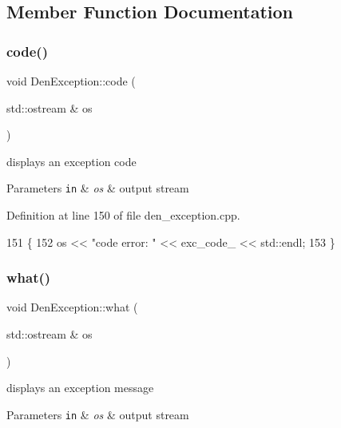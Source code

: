 \subsection{Member Function Documentation}
\mbox{\label{classDenException_a81eaeb9c2f6845516f25ead861040a93}} 
\subsubsection{\texorpdfstring{code()}{code()}}
{\footnotesize\ttfamily void Den\+Exception\+::code (\begin{DoxyParamCaption}\item[{std\+::ostream \&}]{os }\end{DoxyParamCaption})}



displays an exception code 


\begin{DoxyParams}[1]{Parameters}
\mbox{\tt in}  & {\em os} & output stream \\
\hline
\end{DoxyParams}


Definition at line 150 of file den\+\_\+exception.\+cpp.


\begin{DoxyCode}
151   \{
152     os << \textcolor{stringliteral}{"code error: "} << exc\_code\_ << std::endl;
153   \}
\end{DoxyCode}
\mbox{\label{classDenException_a52785aeb451bf203cda123c8dcc9d64e}} 
\subsubsection{\texorpdfstring{what()}{what()}}
{\footnotesize\ttfamily void Den\+Exception\+::what (\begin{DoxyParamCaption}\item[{std\+::ostream \&}]{os }\end{DoxyParamCaption})}



displays an exception message 


\begin{DoxyParams}[1]{Parameters}
\mbox{\tt in}  & {\em os} & output stream \\
\hline
\end{DoxyParams}


